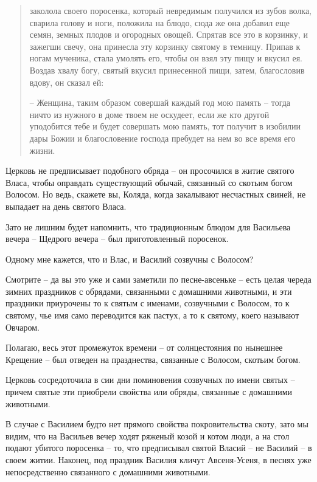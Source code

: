 \documentclass[a5paper,11pt,openany]{article}
\begin{document}
\begin{quotation}
\noindent заколола своего поросенка, который невредимым получился из зубов волка, сварила голову и ноги, положила на блюдо, сюда же она добавил еще семян, земных плодов и огородных овощей. Спрятав все это в корзинку, и зажегши свечу, она принесла эту корзинку святому в темницу. Припав к ногам мученика, стала умолять его, чтобы он взял эту пищу и вкусил ея. Воздав хвалу богу, святый вкусил принесенной пищи, затем, благословив вдову, он сказал ей:

 – Женщина, таким образом совершай каждый год мою память – тогда ничто из нужного в доме твоем не оскудеет, если же кто другой уподобится тебе и будет совершать мою память, тот получит в изобилии дары Божии и благословение господа пребудет на нем во все время его жизни.
\end{quotation}

   Церковь не предписывает подобного обряда – он просочился в житие святого Власа, чтобы оправдать существующий обычай, связанный со скотьим богом Волосом. Но ведь, скажете вы, Коляда, когда закалывают несчастных свиней, не выпадает на день святого Власа.

  Зато не лишним будет напомнить, что традиционным блюдом для Васильева вечера – Щедрого вечера – был приготовленный поросенок.

 Одному мне кажется, что и Влас, и Василий созвучны с Волосом?

  Смотрите – да вы это уже и сами заметили по песне-авсеньке – есть целая череда зимних праздников с обрядами, связанными с домашними животными, и эти праздники приурочены то к святым с именами, созвучными с Волосом, то к святому, чье имя само переводится как пастух, а то к святому, коего называют Овчаром.

   Полагаю, весь этот промежуток времени – от солнцестояния по нынешнее Крещение – был отведен на празднества, связанные с Волосом, скотьим богом.

   Церковь сосредоточила в сии дни поминовения созвучных по имени святых – причем святые эти приобрели свойства или обряды, связанные с домашними животными.

   В случае с Василием будто нет прямого свойства покровительства скоту, зато мы видим, что на Васильев вечер ходят ряженый козой и котом люди, а на стол подают убитого поросенка – то, что предписывал святой Власий – не Василий – в своем житии. Наконец, под праздник Василия кличут Авсеня-Усеня, в песнях уже непосредственно связанного с домашними животными.
\end{document}
